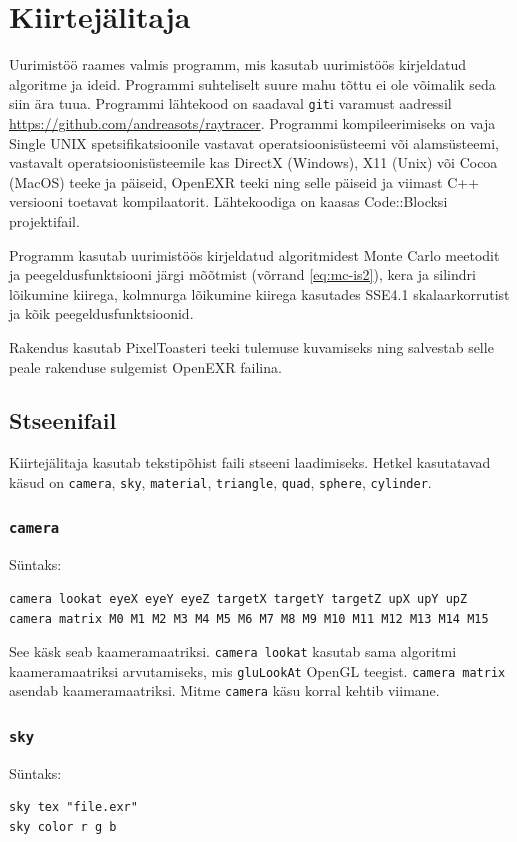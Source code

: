 \documentclass[a4paper,12pt]{report}
\begin{document}
\chapter{Kiirtejälitaja}
Uurimistöö raames valmis programm, mis kasutab uurimistöös kirjeldatud
algoritme ja ideid. Programmi suhteliselt suure mahu tõttu ei ole võimalik
seda siin ära tuua. Programmi lähtekood on saadaval \texttt{git}i varamust
aadressil \url{https://github.com/andreasots/raytracer}. Programmi kompileerimiseks
on vaja Single UNIX spetsifikatsioonile vastavat operatsioonisüsteemi või
alamsüsteemi, vastavalt operatsioonisüsteemile kas DirectX (Windows),
X11 (Unix) või Cocoa (MacOS) teeke ja päiseid, OpenEXR teeki ning selle
päiseid ja viimast C++ versiooni toetavat kompilaatorit. Lähtekoodiga on
kaasas Code::Blocksi projektifail.

Programm kasutab uurimistöös kirjeldatud algoritmidest Monte Carlo meetodit
ja peegeldusfunktsiooni järgi mõõtmist (võrrand \ref{eq:mc-is2}), kera ja
silindri lõikumine kiirega, kolmnurga lõikumine kiirega kasutades SSE4.1
skalaarkorrutist ja kõik peegeldusfunktsioonid.

Rakendus kasutab PixelToasteri teeki tulemuse kuvamiseks ning salvestab
selle peale rakenduse sulgemist OpenEXR failina.

\section{Stseenifail}
Kiirtejälitaja kasutab tekstipõhist faili stseeni laadimiseks. Hetkel 
kasutatavad käsud on \texttt{camera}, \texttt{sky}, \texttt{material},
\texttt{triangle}, \texttt{quad}, \texttt{sphere}, \texttt{cylinder}.

\subsection{\texttt{camera}}
Süntaks:
\begin{verbatim}
camera lookat eyeX eyeY eyeZ targetX targetY targetZ upX upY upZ
camera matrix M0 M1 M2 M3 M4 M5 M6 M7 M8 M9 M10 M11 M12 M13 M14 M15
\end{verbatim}

See käsk seab kaameramaatriksi. \texttt{camera lookat} kasutab sama
algoritmi kaameramaatriksi arvutamiseks, mis \texttt{gluLookAt} OpenGL
teegist. \texttt{camera matrix} asendab kaameramaatriksi. Mitme \texttt{camera}
käsu korral kehtib viimane.

\subsection{\texttt{sky}}
Süntaks:
\begin{verbatim}
sky tex "file.exr"
sky color r g b
\end{verbatim}
\end{document}
